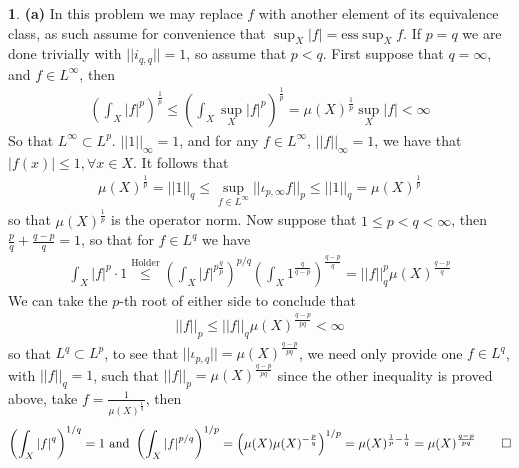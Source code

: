 \documentclass[10.5pt]{article}
\theoremstyle{definition}
\newtheorem{pb}{}
\newcommand{\abs}[1]{\left\vert#1\right\vert}
\newcommand{\norm}[1]{\lvert\lvert#1\rvert\rvert}
\newcommand{\tand}{\text{ and }}
\begin{document}
    \begin{pb}
        \textbf{(a)} In this problem we may replace \(f\) with another element of its equivalence class, as such assume for convenience that \(\sup_X\abs{f} = \text{ess}\sup_X f\). If \(p = q\) we are done trivially with \(\norm{i_{q,q}} = 1\), so assume that \(p < q\). First suppose that \(q = \infty\), and \(f \in L^\infty\), then
        \begin{align*}
            \left(\int_X \abs{f}^p\right)^{\frac{1}{p}} \leq \left(\int_X \sup_X \abs{f}^p\right)^{\frac{1}{p}} = \mu(X)^{\frac{1}{p}}\sup_X\abs{f} < \infty
        \end{align*}
        So that \(L^\infty \subset L^p\). \(\norm{1}_\infty = 1\), and for any \(f \in L^\infty\), \(\norm{f}_\infty = 1\), we have that \(\abs{f(x)} \leq 1, \forall x \in X\). It follows that
        \begin{align*}
            \mu(X)^{\frac{1}{p}} = \norm{1}_q\leq \sup_{f \in L^\infty}\norm{\iota_{p,\infty}f}_p \leq \norm{1}_q = \mu(X)^{\frac{1}{p}}
        \end{align*}
        so that \(\mu(X)^{\frac{1}{p}}\) is the operator norm. Now suppose that \(1 \leq p < q < \infty\), then \(\frac{p}{q} + \frac{q - p}{q} = 1\), so that for \(f \in L^q\) we have
        \begin{align*}
            \int_X \abs{f}^p\cdot 1\overset{\text{Holder}}{\leq} \left(\int_X \abs{f}^{p\frac{q}{p}}\right)^{p/q}\left(\int_X 1^{\frac{q}{q-p}}\right)^{\frac{q-p}{q}} = \norm{f}_q^p\mu(X)^{\frac{q-p}{q}}
        \end{align*}
        We can take the \(p\)-th root of either side to conclude that
        \begin{align*}
            \norm{f}_p \leq \norm{f}_q\mu(X)^{\frac{q-p}{pq}} < \infty
        \end{align*}
        so that \(L^q \subset L^p\), to see that \(\norm{\iota_{p,q}} = \mu(X)^{\frac{q-p}{pq}}\), we need only provide one \(f \in L^q\), with \(\norm{f}_q = 1\), such that \(\norm{f}_p = \mu(X)^{\frac{q-p}{pq}}\) since the other inequality is proved above, take \(f = \frac{1}{\mu(X)^{\frac{1}{q}}}\), then
        \begin{align*}
            \left(\int_X \abs{f}^q\right)^{1/q} = 1 \tand \left(\int_X \abs{f}^{p/q}\right)^{1/p} = \left(\mu(X)\mu(X)^{-\frac{p}{q}}\right)^{1/p} = \mu(X)^{\frac{1}{p} - \frac{1}{q}} = \mu(X)^{\frac{q-p}{pq}} \qed
        \end{align*}


\end{pb}
\end{document}

